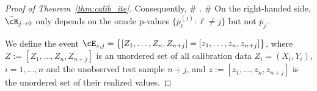 \begin{proof}[Proof of Theorem~\ref{thm:calib_ite}]
Consequently,
\#\label{eq:orc_fdr}
\EE{}
\leq
\EE{}
\leq \EE{}.
\#
On the right-handed side,
$\bar{\cR}_{j\to 0}$ only depends on the oracle p-values $\{\bar{p}_\ell^{(j)}\colon \ell\neq j\}$
but not $\bar{p}_j$.


We define the event
$\cE_{z,j} = \big\{ [Z_1,\dots,Z_n,Z_{n+j}]=[z_1,\dots,z_n,z_{n+j}]\big\}$,
where $Z:=[Z_1,\dots,Z_n,Z_{n+j}]$ is an unordered set of
all calibration data
$Z_i = (X_i,Y_i)$, $i=1,\dots,n$
and the unobserved test sample $n+j$,
and $z:=[z_1,\dots,z_n,z_{n+j}]$ is the unordered set of their realized values.


\end{proof}
